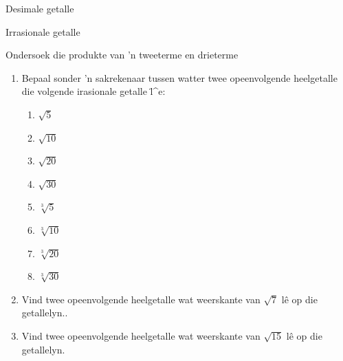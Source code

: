 \begin{Aktiwiteit}{Desimale getalle}
\begin{aktiwiteit}{Irrasionale getalle}
\begin{aktiwiteit}{Ondersoek die produkte van 'n tweeterme en drieterme}
\begin{eocexercises}{}
\begin{enumerate}[itemsep=5pt, label=\textbf{\arabic*}. ]
\item Bepaal sonder 'n sakrekenaar tussen watter twee opeenvolgende heelgetalle die volgende irasionale getalle l\"^e:
\begin{multicols}{2}
    \begin{enumerate}[itemsep=5pt, label=\textbf{\alph*}. ] 
    \item $\sqrt{5}$ 
    \item $\sqrt{10}$ 
    \item $\sqrt{20}$ 
    \item $\sqrt{30}$ 
    \item $\sqrt[3]{5}$ 
    \item $\sqrt[3]{10}$ 
    \item $\sqrt[3]{20}$ 
    \item $\sqrt[3]{30}$ 
    \end{enumerate}
\end{multicols}

\item  Vind twee opeenvolgende heelgetalle wat weerskante van $\sqrt{7}$ lê op die getallelyn..          
\item Vind twee opeenvolgende heelgetalle wat weerskante van $\sqrt{15}$ lê op die getallelyn.          





\end{enumerate}
\end{eocexercises}
\end{aktiwiteit}
\end{aktiwiteit}
\end{Aktiwiteit}
